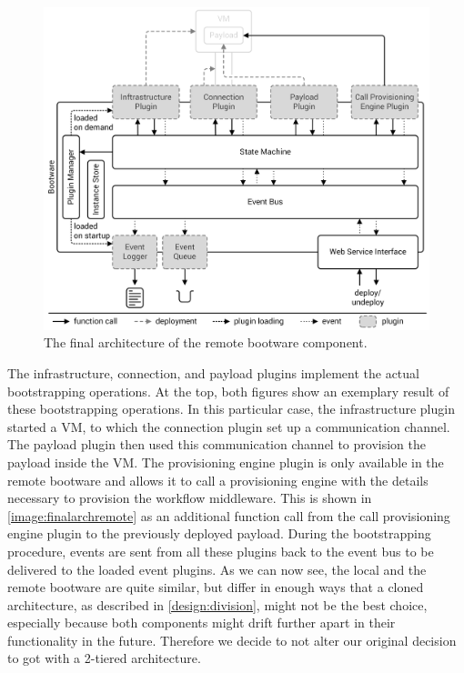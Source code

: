 \begin{figure}[!htbp]
	\centering
	\includegraphics[resolution=600]{design/assets/final_architecture_remote}
	\caption{The final architecture of the remote bootware component.}
	\label{image:finalarchremote}
\end{figure}

The infrastructure, connection, and payload plugins implement the actual bootstrapping operations.
At the top, both figures show an exemplary result of these bootstrapping operations.
In this particular case, the infrastructure plugin started a VM, to which the connection plugin set up a communication channel.
The payload plugin then used this communication channel to provision the payload inside the VM.
The provisioning engine plugin is only available in the remote bootware and allows it to call a provisioning engine with the details necessary to provision the workflow middleware.
This is shown in \autoref{image:finalarchremote} as an additional function call from the call provisioning engine plugin to the previously deployed payload.
During the bootstrapping procedure, events are sent from all these plugins back to the event bus to be delivered to the loaded event plugins.
As we can now see, the local and the remote bootware are quite similar, but differ in enough ways that a cloned architecture, as described in \autoref{design:division}, might not be the best choice, especially because both components might drift further apart in their functionality in the future.
Therefore we decide to not alter our original decision to got with a 2-tiered architecture.
